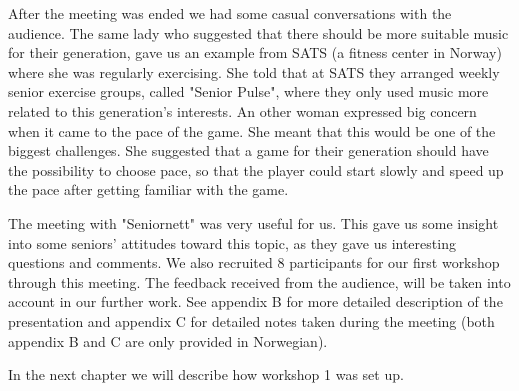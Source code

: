 After the meeting was ended we had some casual conversations with the audience. The same lady who suggested that there should be more suitable music for their generation, gave us an example from SATS (a fitness center in Norway) where she was regularly exercising. She told that at SATS they arranged weekly senior exercise groups, called "Senior Pulse", where they only used music more related to this generation's interests. An other woman expressed big concern when it came to the pace of the game. She meant that this would be one of the biggest challenges. She suggested that a game for their generation should have the possibility to choose pace, so that the player could start slowly and speed up the pace after getting familiar with the game.

The meeting with "Seniornett" was very useful for us. This gave us some insight into some seniors' attitudes toward this topic, as they gave us interesting questions and comments. We also recruited 8 participants for our first workshop through this meeting. The feedback received from the audience, will be taken into account in our further work. See appendix B for more detailed description of the presentation and appendix C for detailed notes taken during the meeting (both appendix B and C are only provided in Norwegian).

In the next chapter we will describe how workshop 1 was set up. 


    